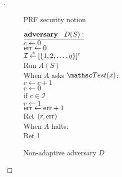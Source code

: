 \begin{proof}[]
\begin{figure}
\centering
{}
\caption{PRF security notion}\label{fig:prf}
\end{figure}


\begin{figure}
\centering
{}
{
${\underline{\textbf{adversary}\hspace*{2ex} {D(S)}:}}$\\[4pt]
$c \gets 0$\\%
$\mathrm{err} \gets 0$\\
$\mathcal{I}{\:\stackrel{{\scriptscriptstyle \hspace{0.2em}\$}} {\leftarrow}\:} [\{1,2,\ldots,q\}]^r$\\
Run $A(S)$\\
When $A$ asks $\Test(x)$:\\
\nudge $c \gets c+1$\\
\nudge $r \gets 0$\\
\nudge if $c \in \mathcal{I}$\\
\nudge \nudge $r \gets 1$\\
\nudge \nudge $\mathrm{err} \gets \mathrm{err} + 1$\\
\nudge Ret $(r,\mathrm{err} )$\\
When $A$ halts:\\
\nudge Ret 1
}
\caption{Non-adaptive adversary $D$} \label{fig:D}
\end{figure}	

\end{proof}


